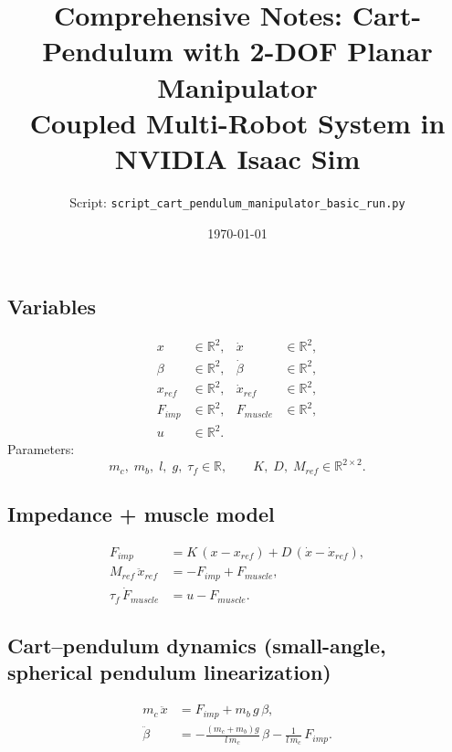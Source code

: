 \documentclass[11pt,a4paper]{article}
\title{Comprehensive Notes: Cart-Pendulum with 2-DOF Planar Manipulator\\
\large Coupled Multi-Robot System in NVIDIA Isaac Sim}
\author{Script: \texttt{script\_cart\_pendulum\_manipulator\_basic\_run.py}}
\date{\today}
\begin{document}

\subsection*{Variables}
\begin{align*}
x &\in \mathbb{R}^2, & \dot{x} &\in \mathbb{R}^2,\\
\beta &\in \mathbb{R}^2, & \dot{\beta} &\in \mathbb{R}^2,\\
x_{ref} &\in \mathbb{R}^2, & \dot{x}_{ref} &\in \mathbb{R}^2,\\
F_{imp} &\in \mathbb{R}^2, & F_{muscle} &\in \mathbb{R}^2,\\
u &\in \mathbb{R}^2.
\end{align*}
Parameters:
\[
m_c,\; m_b,\; l,\; g,\; \tau_f \in \mathbb{R}, 
\qquad
K,\; D,\; M_{ref} \in \mathbb{R}^{2\times 2}.
\]

\subsection*{Impedance + muscle model}
\begin{align}
F_{imp} &= K\,(x-x_{ref}) + D\,(\dot{x}-\dot{x}_{ref}), \label{eq:impedance}\\
M_{ref}\,\ddot{x}_{ref} &= -F_{imp} + F_{muscle}, \label{eq:ref_dyn}\\
\tau_f\,\dot{F}_{muscle} &= u - F_{muscle}. \label{eq:muscle_filter}
\end{align}

\subsection*{Cart--pendulum dynamics (small-angle, spherical pendulum linearization)}
\begin{align}
m_c\,\ddot{x} &= F_{imp} + m_b\,g\,\beta, \label{eq:cart}\\
\ddot{\beta} &=
-\frac{(m_c+m_b)g}{l\,m_c}\,\beta
-\frac{1}{l\,m_c}\,F_{imp}. \label{eq:pend}
\end{align}
\end{document}
